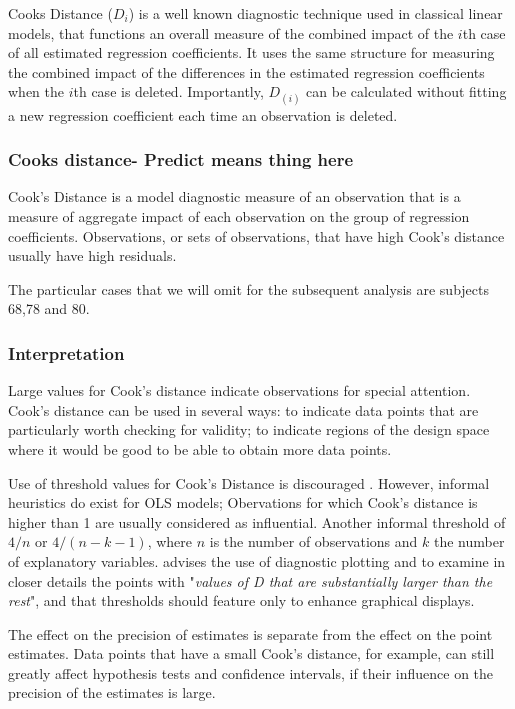 \documentclass[12pt, a4paper]{report}
\theoremstyle{plain}
\theoremstyle{definition}
\theoremstyle{remark}
\begin{document}
 Cooks Distance ($D_{i}$) is a well known diagnostic technique used in classical linear models, that functions an overall measure of the combined impact of the $i$th case of all estimated regression coefficients. It uses the same structure for measuring the combined impact of the differences in the estimated regression coefficients when the $i$th case is deleted. Importantly, $D_{(i)}$ can be calculated without fitting a new regression coefficient each time an observation is deleted.
	
\subsubsection{Cooks distance- Predict means thing here}
Cook's Distance is a model diagnostic measure of an observation that is a measure of aggregate impact of each observation on the group of regression coefficients. Observations, or sets of observations, that have high Cook's distance usually have high residuals.
	
The particular cases that we will omit for the subsequent analysis are subjects 68,78 and 80.
	
\subsubsection{Interpretation}
Large values for Cook's distance indicate observations for special attention. Cook's distance can be used in several ways: to indicate data points that are particularly worth checking for validity; to indicate regions of the design space where it would be good to be able to obtain more data points.
	
	
	
	Use of threshold values for Cook's Distance is discouraged \citep{fox1997}. However, informal heuristics do exist for OLS models; Obervations for which Cook's distance is higher than 1 are usually considered as influential. Another informal threshold of $4/n$ or $4/(n-k-1)$, where $n$ is the number of observations and $k$ the number of explanatory variables.
\citet{fox1997} advises the use of diagnostic plotting and to examine in closer details the points with "\textit{values of D that are substantially larger than the rest}", and that thresholds should feature only to enhance graphical displays.
	
	
	The effect on the precision of estimates is separate from the effect on the point estimates. Data points that have a small Cook's distance, for example, can still greatly affect hypothesis tests and confidence intervals, if their  influence on the precision of the estimates is large.
	
\end{document}

